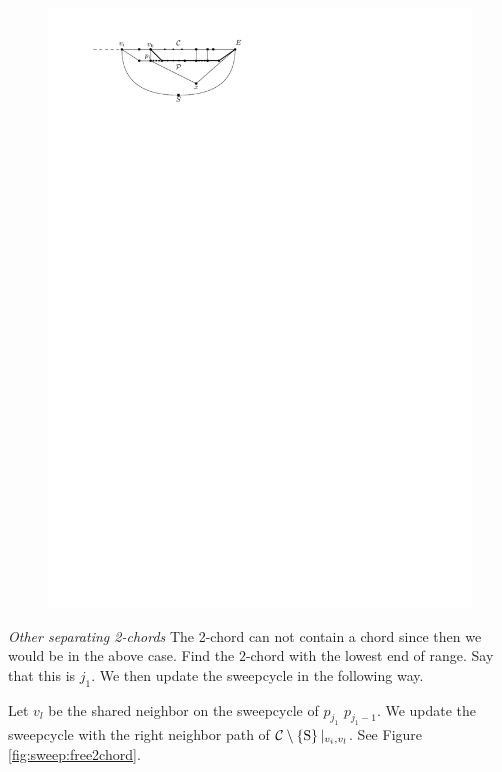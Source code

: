     \begin{figure}[h]
      \centering
      \includegraphics[scale=1]{unifiedAlgo/img/sweep/pEBound}
      \caption{}
      \label{fig:sweep:pEBound}
    \end{figure}
    \emph{Other separating 2-chords}
    The 2-chord can not contain a chord since then we would be in the above case.
    Find the $2$-chord with the lowest end of range. Say that this is $j_1$. We then update the sweepcycle in the following way.

    Let $v_l$ be the shared neighbor on the sweepcycle of $p_{j_1}$ $p_{j_1 -1}$. We update the sweepcycle with the right neighbor path of $\mathcal{C} \setminus \left\lbrace {\mathrm{S}} \right\rbrace|_{v_i, v_l}$. See Figure \ref{fig:sweep:free2chord}.


